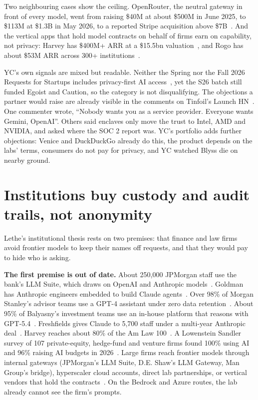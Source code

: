 \documentclass[10pt,a4paper]{article}
\begin{document}
Two neighbouring cases show the ceiling. OpenRouter, the neutral gateway in front of every model, went from raising \$40M at about \$500M in June 2025, to \$113M at \$1.3B in May 2026, to a reported Stripe acquisition above \$7B~\cite{contrary-research-openrout,bloomberg-stripe-and-openr}. And the vertical apps that hold model contracts on behalf of firms earn on capability, not privacy: Harvey has \$400M+ ARR at a \$15.5bn valuation~\cite{legal-business-harvey}, and Rogo has about \$53M ARR across 300+ institutions~\cite{sacra-rogo}.

YC's own signals are mixed but readable. Neither the Spring nor the Fall 2026 Requests for Startups includes privacy-first AI access~\cite{let-s-data-science,explainx-yc-requests-for}, yet the S26 batch still funded Egoist and Caution, so the category is not disqualifying. The objections a partner would raise are already visible in the comments on Tinfoil's Launch HN~\cite{launch-hn-tinfoil}. One commenter wrote, ``Nobody wants you as a service provider. Everyone wants Gemini, OpenAI''. Others said enclaves only move the trust to Intel, AMD and NVIDIA, and asked where the SOC 2 report was. YC's portfolio adds further objections: Venice and DuckDuckGo already do this, the product depends on the labs' terms, consumers do not pay for privacy, and YC watched Blyss die on nearby ground.

\section{Institutions buy custody and audit trails, not anonymity}

Lethe's institutional thesis rests on two premises: that finance and law firms avoid frontier models to keep their names off requests, and that they would pay to hide who is asking.

\textbf{The first premise is out of date.} About 250,000 JPMorgan staff use the bank's LLM Suite, which draws on OpenAI and Anthropic models~\cite{cefpro-jpmorgan-llm-suite}. Goldman has Anthropic engineers embedded to build Claude agents~\cite{hargreaves-lansdown-goldma}. Over 98\% of Morgan Stanley's advisor teams use a GPT-4 assistant under zero data retention~\cite{openai-morgan-stanley}. About 95\% of Balyasny's investment teams use an in-house platform that reasons with GPT-5.4~\cite{cfotech-balyasny}. Freshfields gives Claude to 5,700 staff under a multi-year Anthropic deal~\cite{freshfields-anthropic-part}. Harvey reaches about 80\% of the Am Law 100~\cite{legal-business-harvey}. A Lowenstein Sandler survey of 107 private-equity, hedge-fund and venture firms found 100\% using AI and 96\% raising AI budgets in 2026~\cite{lowenstein-sandler-alterna}. Large firms reach frontier models through internal gateways (JPMorgan's LLM Suite, D.E. Shaw's LLM Gateway, Man Group's bridge), hyperscaler cloud accounts, direct lab partnerships, or vertical vendors that hold the contracts~\cite{resonanz-capital}. On the Bedrock and Azure routes, the lab already cannot see the firm's prompts.
\end{document}
